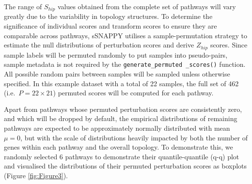 \documentclass[9pt,a4paper,]{extarticle}
\newenvironment{Shaded}{\begin{snugshade}}{\end{snugshade}}
\newcommand{\AttributeTok}[1]{\textcolor[rgb]{0.13,0.29,0.53}{#1}}
\newcommand{\FunctionTok}[1]{\textcolor[rgb]{0.13,0.29,0.53}{\textbf{#1}}}
\newcommand{\NormalTok}[1]{#1}
\newcommand{\OtherTok}[1]{\textcolor[rgb]{0.56,0.35,0.01}{#1}}
\newcommand{\SpecialCharTok}[1]{\textcolor[rgb]{0.81,0.36,0.00}{\textbf{#1}}}
\begin{document}
The range of \(S_{hip}\) values obtained from the complete set of pathways will vary greatly due to the variability in topology structures.
To determine the significance of individual scores and transform scores to ensure they are comparable across pathways, sSNAPPY utilises a sample-permutation strategy to estimate the null distributions of perturbation scores and derive \(Z_{hip}\) scores.
Since sample labels will be permuted randomly to put samples into pseudo-pairs, sample metadata is not required by the \texttt{generate\_permuted\ \_scores()} function.
All possible random pairs between samples will be sampled unless otherwise specified.
In this example dataset with a total of 22 samples, the full set of 462 (i.e.~\(P = 22 \times 21\)) permuted scores will be computed for each pathway.

\begin{Shaded}
\end{Shaded}

Apart from pathways whose permuted perturbation scores are consistently zero, and which will be dropped by default, the empirical distributions of remaining pathways are expected to be approximately normally distributed with mean \(\mu = 0\), but with the scale of distributions heavily impacted by both the number of genes within each pathway and the overall topology.
To demonstrate this, we randomly selected 6 pathways to demonstrate their quantile-quantile (q-q) plot and visualised the distributions of their permuted perturbation scores as boxplots (Figure \ref{fig:Figure3}).
\end{document}
